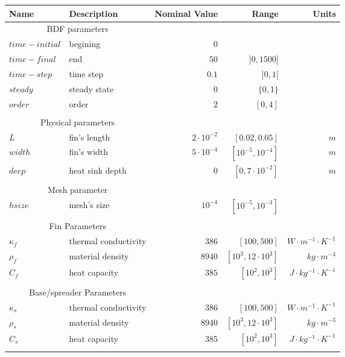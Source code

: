 \begin{table}[htbp]
  \centering
  \begin{tabular}{@{}llrrr@{}} \toprule
Name & Description & Nominal Value & Range & Units \\ \midrule
\multicolumn{2}{c}{BDF parameters} \\ \cmidrule(r){1-2}
$time-initial$ & begining & $0$ & &  \\
$time-final$ & end & $50$ & $]0, 1500]$ &  \\
$time-step$ & time step & $0.1$ & $]0,1[$ &  \\
$steady$ & steady state & $0$ & $\{0,1\}$ &  \\
$order$ & order & $2$ & $[0, 4]$ & \\\\

\multicolumn{2}{c}{Physical parameters} \\ \cmidrule(r){1-2}
$L$ & fin's length & $2\cdot 10^{-2}$ & $[0.02, 0.05]$ & $m$ \\
$width$ & fin's width & $5\cdot 10^{-4}$ & $[10^{-5}, 10^{-4}]$ & $m$ \\
$deep$ & heat sink depth & $0$ & $[0, 7\cdot 10^{-2}]$ & $m$ \\\\

\multicolumn{2}{c}{Mesh parameter} \\ \cmidrule(r){1-2}
$hsize$ & mesh's size & $10^{-4}$ & $[10^{-5},10^{-3} ]$ & \\\\

\multicolumn{2}{c}{Fin Parameters} \\ \cmidrule(r){1-2}
$\kappa_f$ & thermal conductivity & $386$ & $[100,500] $ & $W \cdot m^{-1} \cdot K^{-1}$\\
$\rho_f$ & material density & $8940$ & $[10^3,12\cdot 10^3 ]$ & $kg\cdot m^{-3}$\\
$C_f$ & heat capacity & $385$ & $[10^2,10^3]$ & $J\cdot kg^{-1} \cdot K^{-1}$\\\\

\multicolumn{2}{c}{Base/spreader Parameters} \\ \cmidrule(r){1-2}
$\kappa_s$ & thermal conductivity & $386$ & $[100,500] $ & $W \cdot m^{-1} \cdot K^{-1}$\\
$\rho_s$ & material density & $8940$ & $[10^3,12\cdot 10^3 ]$ & $kg\cdot m^{-3}$\\
$C_s$ & heat capacity & $385$ & $[10^2,10^3]$ & $J\cdot kg^{-1} \cdot K^{-1}$\\\\


\end{tabular}
\end{table}
